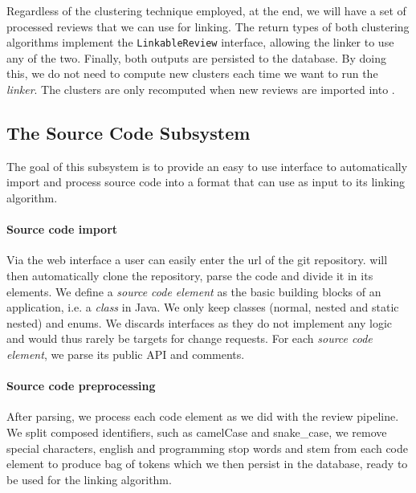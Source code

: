 Regardless of the clustering technique employed, at the end, we will have a set of processed reviews that we can use for linking. The return types of both clustering algorithms implement the \texttt{LinkableReview} interface, allowing the linker to use any of the two. Finally, both outputs are persisted to the database. By doing this, we do not need to compute new clusters each time we want to run the \textit{linker}. The clusters are only recomputed when new reviews are imported into \tool{}.

%
%
\subsection{The Source Code Subsystem}

The goal of this subsystem is to provide an easy to use interface to automatically import and process source code into a format that \tool{} can use as input to its linking algorithm. 
\paragraph{Source code import} 
Via the web interface a user can easily enter the url of the git repository. \tool{} will then automatically clone the repository, parse the code and divide it in its elements. We define a \textit{source code element} as the basic building blocks of an application, i.e. a \textit{class} in Java. We only keep classes (normal, nested and static nested) and enums. We discards interfaces as they do not implement any logic and would thus rarely be targets for change requests.
For each \textit{source code element}, we parse its public API and comments. 

\paragraph{Source code preprocessing}
After parsing, we process each code element as we did with the review pipeline.
We split composed identifiers, such as camelCase and snake\_case, we remove special characters, english and programming stop words and stem from each code element to produce bag of tokens which we then persist in the database, ready to be used for the linking algorithm. 

%
%
